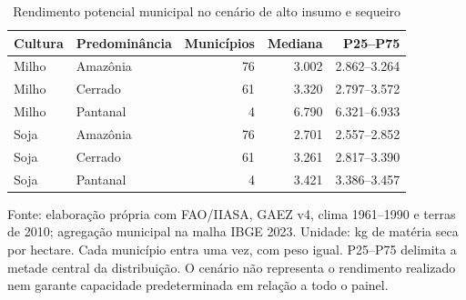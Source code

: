 \begin{table}[htbp]
\centering
\small
\caption{Rendimento potencial municipal no cenário de alto insumo e sequeiro}\label{tab:h1-capacidade}
\begin{tabular}{llrrr}
\hline
Cultura & Predominância & Municípios & Mediana & P25--P75 \\
\hline
Milho & Amazônia & 76 & 3.002 & 2.862--3.264 \\
Milho & Cerrado & 61 & 3.320 & 2.797--3.572 \\
Milho & Pantanal & 4 & 6.790 & 6.321--6.933 \\
Soja & Amazônia & 76 & 2.701 & 2.557--2.852 \\
Soja & Cerrado & 61 & 3.261 & 2.817--3.390 \\
Soja & Pantanal & 4 & 3.421 & 3.386--3.457 \\
\hline
\end{tabular}
\par\smallskip\begin{minipage}{\textwidth}\footnotesize
Fonte: elaboração própria com FAO/IIASA, GAEZ v4, clima 1961--1990 e terras de 2010; agregação municipal na malha IBGE 2023. Unidade: kg de matéria seca por hectare. Cada município entra uma vez, com peso igual. P25--P75 delimita a metade central da distribuição. O cenário não representa o rendimento realizado nem garante capacidade predeterminada em relação a todo o painel.
\end{minipage}
\end{table}
